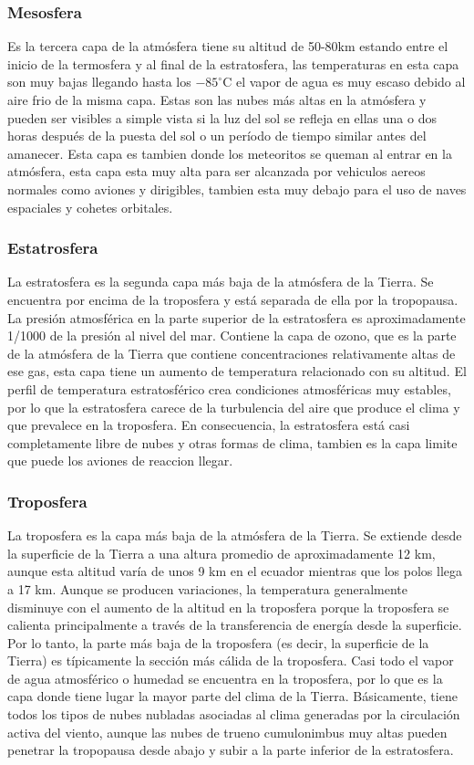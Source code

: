 \documentclass{article}
\begin{document}
\subsubsection{Mesosfera}
Es la tercera capa de la atmósfera tiene su altitud  de 50-80km estando entre el inicio de la termosfera y al final de la estratosfera, las temperaturas en esta capa son muy bajas llegando hasta los $-85^{\circ}$C el vapor de agua es muy escaso debido al aire frio de la misma capa. Estas son las nubes más altas en la atmósfera y pueden ser visibles a simple vista si la luz del sol se refleja en ellas una o dos horas después de la puesta del sol o un período de tiempo similar antes del amanecer. Esta capa es tambien donde los meteoritos se queman al entrar en la atmósfera, esta capa esta muy alta para ser alcanzada por vehiculos aereos normales como aviones y dirigibles, tambien esta muy debajo para el uso de naves espaciales y cohetes orbitales.

\subsubsection{Estatrosfera}
La estratosfera es la segunda capa más baja de la atmósfera de la Tierra. Se encuentra por encima de la troposfera y está separada de ella por la tropopausa. La presión atmosférica en la parte superior de la estratosfera es aproximadamente 1/1000 de la presión al nivel del mar. Contiene la capa de ozono, que es la parte de la atmósfera de la Tierra que contiene concentraciones relativamente altas de ese gas, esta capa tiene un aumento de temperatura relacionado con su altitud. El perfil de temperatura estratosférico crea condiciones atmosféricas muy estables, por lo que la estratosfera carece de la turbulencia del aire que produce el clima y que prevalece en la troposfera. En consecuencia, la estratosfera está casi completamente libre de nubes y otras formas de clima, tambien es la capa limite que puede los aviones de reaccion llegar.
\subsubsection{Troposfera}
La troposfera es la capa más baja de la atmósfera de la Tierra. Se extiende desde la superficie de la Tierra a una altura promedio de aproximadamente 12 km, aunque esta altitud varía de unos 9 km en el ecuador mientras que los polos llega a 17 km. Aunque se producen variaciones, la temperatura generalmente disminuye con el aumento de la altitud en la troposfera porque la troposfera se calienta principalmente a través de la transferencia de energía desde la superficie. Por lo tanto, la parte más baja de la troposfera (es decir, la superficie de la Tierra) es típicamente la sección más cálida de la troposfera. Casi todo el vapor de agua atmosférico o humedad se encuentra en la troposfera, por lo que es la capa donde tiene lugar la mayor parte del clima de la Tierra. Básicamente, tiene todos los tipos de nubes nubladas asociadas al clima generadas por la circulación activa del viento, aunque las nubes de trueno cumulonimbus muy altas pueden penetrar la tropopausa desde abajo y subir a la parte inferior de la estratosfera.
\end{document}
